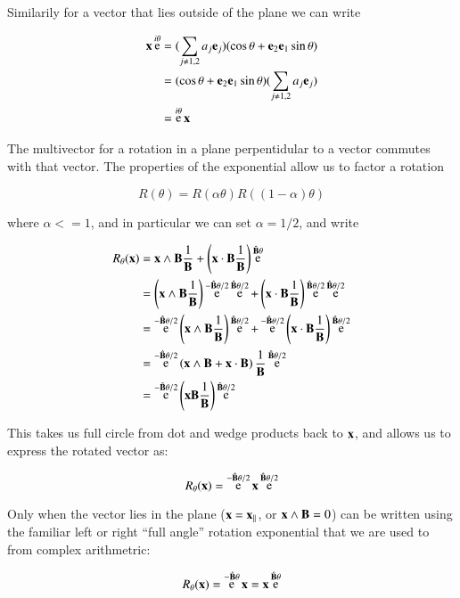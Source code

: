 \documentclass{article}      %
\DeclareMathOperator{\Exp}{e}
\begin{document}
Similarily for a vector that lies outside of the plane we can write

\begin{align*}
\Bx \Exp^{i\theta} 
&= (\sum_{j \ne 1,2} a_j \Be_j)(\cos\theta + \Be_2 \Be_1\sin\theta) \\
&= (\cos\theta + \Be_2 \Be_1\sin\theta) (\sum_{j \ne 1,2} a_j \Be_j) \\
&= \Exp^{i\theta}\Bx
\end{align*}

The multivector for a rotation in a plane perpentidular to a vector commutes with that vector.  The properties of the 
exponential allow us to factor a rotation

\[
R(\theta) = R(\alpha\theta) R((1-\alpha)\theta)
\]

where $\alpha <= 1$, and in particular we can set $\alpha = 1/2$, and write

\begin{align*}
R_\theta(\Bx) 
&= \Bx \wedge \BB \inv{\BB} + \left(\Bx \cdot \BB \inv{\BB}\right)\Exp^{\hat{\BB}\theta} \\
&= \left(\Bx \wedge \BB \inv{\BB}\right) \Exp^{-\hat{\BB}\theta/2} \Exp^{\hat{\BB}\theta/2} 
 + \left(\Bx \cdot \BB \inv{\BB} \right) \Exp^{\hat{\BB}\theta/2} \Exp^{\hat{\BB}\theta/2} \\
&= \Exp^{-\hat{\BB}\theta/2} \left(\Bx \wedge \BB \inv{\BB}\right) \Exp^{\hat{\BB}\theta/2}  
+ \Exp^{-\hat{\BB}\theta/2} \left(\Bx \cdot \BB \inv{\BB}\right)\Exp^{\hat{\BB}\theta/2} \\
&= \Exp^{-\hat{\BB}\theta/2} \left(\Bx \wedge \BB + \Bx \cdot \BB\right) \inv{\BB} \Exp^{\hat{\BB}\theta/2} \\
&= \Exp^{-\hat{\BB}\theta/2} \left(\Bx \BB \inv{\BB} \right) \Exp^{\hat{\BB}\theta/2}  
\end{align*}

This takes us full circle from dot and wedge products back to $\mathbf{x}$, and allows us to express the rotated vector as:

\begin{equation}\label{eqn:rotor}
R_\theta(\Bx) 
= \Exp^{-\hat{\BB}\theta/2} \Bx \Exp^{\hat{\BB}\theta/2}
\end{equation}

Only when the vector lies in the plane ($\mathbf{x} = \mathbf{x}_\parallel$, or $\mathbf{x} \wedge \mathbf{B} = 0$) can be written using the familiar left or right ``full angle'' rotation exponential that we are used to from complex arithmetric:

\[
R_\theta(\Bx) = \Exp^{-\hat{\BB}\theta} \Bx = \Bx \Exp^{\hat{\BB}\theta}
\]
\end{document}
